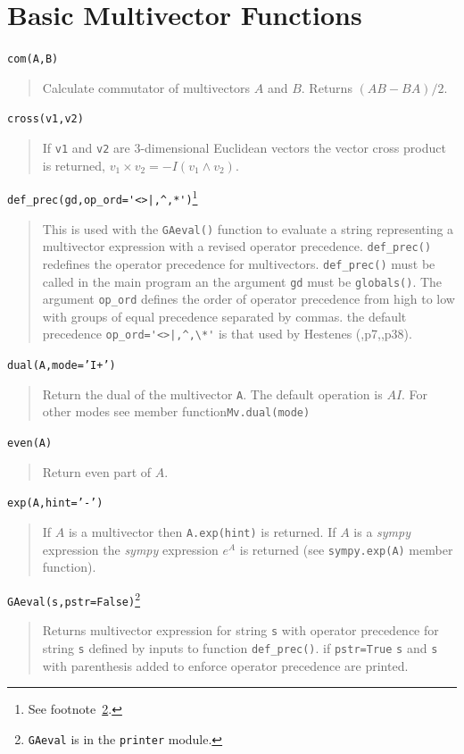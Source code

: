 \documentclass[12pt]{report}
\newcommand{\lp}{\left (}
\newcommand{\rp}{\right )}
\newcommand{\W}{\wedge}
\newcommand{\paren}[1]{\lp {#1} \rp}
\newcommand{\T}[1]{\texttt{#1}}
\begin{document}
\section{Basic Multivector Functions}

\T{com(A,B)}
\begin{quote}
   Calculate commutator of multivectors $A$ and $B$.  Returns $(AB-BA)/2$.
\end{quote}

\T{cross(v1,v2)}
\begin{quote}
   If \T{v1} and \T{v2} are 3-dimensional Euclidean vectors the vector cross product is
   returned, $v_{1}\times v_{2} = -I\paren{v_{1}\W v_{2}}$.
\end{quote}

\lstinline$def_prec(gd,op_ord='<>|,^,*')$\footnote{See footnote~\ref{fn_6}.}
\begin{quote}
   This is used with the \T{GAeval()} function to evaluate a string representing a multivector
   expression with a revised operator precedence.  \T{def\_prec()} redefines the operator
   precedence for multivectors. \T{def\_prec()} must be called in the main program an the
   argument \T{gd} must be \T{globals()}.  The argument \T{op\_ord} defines the order of operator
   precedence from high to low with groups of equal precedence separated by commas. the default
   precedence \lstinline$op_ord='<>|,^,\*'$ is that used by Hestenes (\cite{Hestenes},p7,\cite{Doran},p38).
\end{quote}

\T{dual(A,mode='I+')}
\begin{quote}
   Return the dual of the multivector \T{A}. The default operation is $AI$.  For other modes see member
   function\T{Mv.dual(mode)}
\end{quote}

\T{even(A)}
\begin{quote}
    Return even part of $A$.
\end{quote}

\T{exp(A,hint='-')}
\begin{quote}
    If $A$ is a multivector then \T{A.exp(hint)} is returned.  If $A$ is a \emph{sympy}
    expression the \emph{sympy}     expression $e^{A}$ is returned (see \T{sympy.exp(A)} member function).
\end{quote}

\T{GAeval(s,pstr=False)}\footnote{\T{GAeval} is in the \T{printer} module.\label{fn_6}}
\begin{quote}
   Returns multivector expression for string \T{s} with operator precedence for
   string \T{s} defined by inputs to function \T{def\_prec()}.  if \T{pstr=True}
   \T{s} and \T{s} with parenthesis added to enforce operator precedence are printed.
\end{quote}
\end{document}
